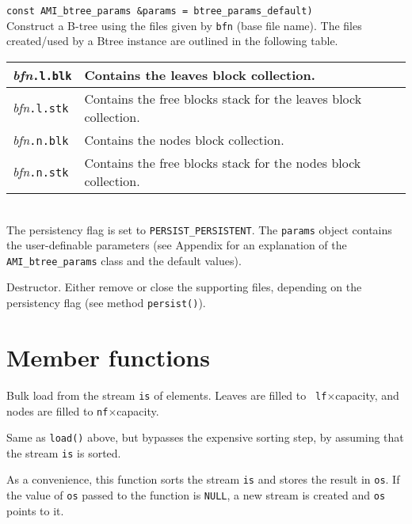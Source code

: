     { {\tt\qquad\qquad\qquad\qquad const
   AMI\_btree\_params \&params = btree\_params\_default)}\\ Construct a B-tree
   using the files given by {\tt bfn} (base file name).  The files
   created/used by a Btree instance are outlined in the following
   table.\\[1mm] \begin{tabular}{|l|l|} \hline {\em bfn}{\tt .l.blk} &
   Contains the leaves block collection.\\ \hline {\em bfn}{\tt .l.stk} &
   Contains the free blocks stack for the leaves block collection.\\ \hline
   {\em bfn}{\tt .n.blk} & Contains the nodes block collection.\\ \hline
   {\em bfn}{\tt .n.stk} & Contains the free blocks stack for the nodes
   block collection.\\ \hline \end{tabular}\\[2mm] The persistency flag is
   set to {\tt PERSIST\_PERSISTENT}. The {\tt params} object contains the
   user-definable parameters (see Appendix for an explanation of the {\tt
   AMI\_btree\_params} class and the default values).}

    {Destructor. Either remove or close the supporting
   files, depending on the persistency flag (see method {\tt persist()}).}

\etabb

\section{Member functions}

\btabb

   {Bulk load from the stream {\tt is} of elements. Leaves are filled to {\tt
   lf}$\times$capacity, and nodes are filled to {\tt nf}$\times$capacity.}

    {Same as {\tt load()} above, but bypasses the expensive sorting
   step, by assuming that the stream {\tt is} is sorted.}

    {As a
   convenience, this function sorts the stream {\tt is} and stores the
   result in {\tt os}. If the value of {\tt os} passed to the function is
   {\tt NULL}, a new stream is created and {\tt os} points to it.}

